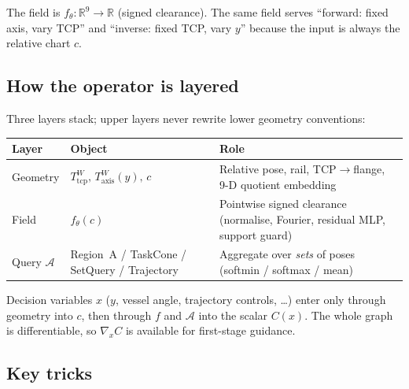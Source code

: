 \documentclass[11pt,a4paper]{article}
\newcommand{\R}{\mathbb{R}}
\newcommand{\Tcp}{T_{\mathrm{tcp}}}
\newcommand{\Taxis}{T_{\mathrm{axis}}}
\begin{document}
The field is \(f_{\theta}:\R^{9}\to\R\) (signed clearance). The same field
serves ``forward: fixed axis, vary TCP'' and ``inverse: fixed TCP, vary \(y\)''
because the input is always the relative chart \(c\).

\subsection{How the operator is layered}
\label{sec:operator-layers}

Three layers stack; upper layers never rewrite lower geometry conventions:

\begin{center}
\begin{tabular}{@{}llp{5.8cm}@{}}
\toprule
Layer & Object & Role \\
\midrule
Geometry
  & \(\Tcp^{W},\,\Taxis^{W}(y),\,c\)
  & Relative pose, rail, TCP\(\to\)flange, 9-D quotient embedding \\
Field
  & \(f_{\theta}(c)\)
  & Pointwise signed clearance (normalise, Fourier, residual MLP, support guard) \\
Query \(\mathcal{A}\)
  & Region~A / TaskCone / SetQuery / Trajectory
  & Aggregate over \emph{sets} of poses (softmin / softmax / mean) \\
\bottomrule
\end{tabular}
\end{center}

Decision variables \(x\) (\(y\), vessel angle, trajectory controls, \ldots) enter
only through geometry into \(c\), then through \(f\) and \(\mathcal{A}\) into
the scalar \(C(x)\). The whole graph is differentiable, so \(\nabla_{x}C\) is
available for first-stage guidance.

\subsection{Key tricks}
\label{sec:tricks}
\end{document}
